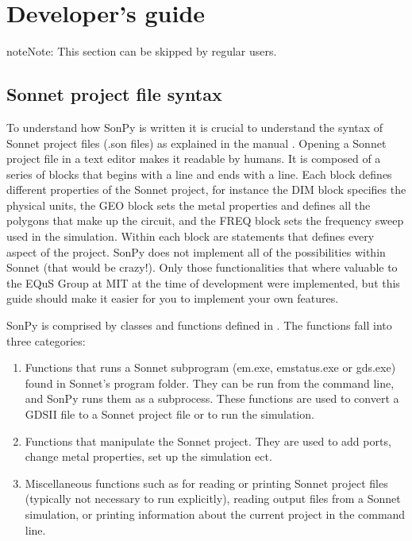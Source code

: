 \documentclass[letterpaper,10pt,english,openany]{sphinxmanual}
\begin{document}
\chapter{Developer’s guide}
\label{\detokenize{source/dev_guide:developer-s-guide}}\label{\detokenize{source/dev_guide::doc}}
\begin{sphinxadmonition}{note}{Note:}
This section can be skipped by regular users.
\end{sphinxadmonition}


\section{Sonnet project file syntax}
\label{\detokenize{source/dev_guide:sonnet-project-file-syntax}}
To understand how SonPy is written it is crucial to understand the syntax of Sonnet project files (.son files) as explained in the manual \label{\detokenize{source/dev_guide:id1}}{\hyperref[\detokenize{source/users_guide:son15}]{\sphinxcrossref{{[}Son15{]}}}}. Opening a Sonnet project file in a text editor makes it readable by humans. It is composed of a series of blocks that begins with a  line and ends with a  line. Each block defines different properties of the Sonnet project, for instance the DIM block specifies the physical units, the GEO block sets the metal properties and defines all the polygons that make up the circuit, and the FREQ block sets the frequency sweep used in the simulation. Within each block are statements that defines every aspect of the project. SonPy does not implement all of the possibilities within Sonnet (that would be crazy!). Only those functionalities that where valuable to the EQuS Group at MIT at the time of development were implemented, but this guide should make it easier for you to implement your own features.

SonPy is comprised by classes and functions defined in . The functions fall into three categories:
\begin{enumerate}
\item {} 
Functions that runs a Sonnet subprogram (em.exe, emstatus.exe or gds.exe) found in Sonnet’s program folder. They can be run from the command line, and SonPy runs them as a subprocess. These functions are used to convert a GDSII file to a Sonnet project file or to run the simulation.

\item {} 
Functions that manipulate the Sonnet project. They are used to add ports, change metal properties, set up the simulation ect.

\item {} 
Miscellaneous functions such as for reading or printing Sonnet project files (typically not necessary to run explicitly), reading output files from a Sonnet simulation, or printing information about the current project in the command line.

\end{enumerate}
\end{document}

